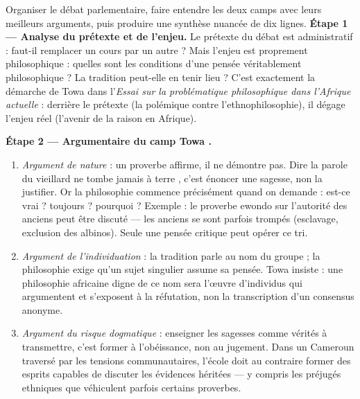 \documentclass[11pt]{article}
\newcounter{popsec}
\newcounter{popsub}
\newcommand{\courssub}[1]{%
  \stepcounter{popsub}%
  \par\vspace{9pt}\noindent{\popxbold\fontsize{11.5}{13}\selectfont\color{popink}{\color{poporange}\thepopsec.\thepopsub}\hspace{6pt}#1}\par\nopagebreak\vspace{4pt}
}
\begin{document}
\courssub{Démarche et corrigé commenté}

\begin{exoresolu}
Organiser le débat parlementaire, faire entendre les deux camps avec leurs meilleurs arguments, puis produire une synthèse nuancée de dix lignes.
\tcblower
\textbf{Étape 1 — Analyse du prétexte et de l'enjeu.} Le prétexte du débat est administratif : faut-il remplacer un cours par un autre ? Mais l'enjeu est proprement philosophique : quelles sont les conditions d'une pensée véritablement philosophique ? La tradition peut-elle en tenir lieu ? C'est exactement la démarche de Towa dans l'\emph{Essai sur la problématique philosophique dans l'Afrique actuelle} : derrière le prétexte (la polémique contre l'ethnophilosophie), il dégage l'enjeu réel (l'avenir de la raison en Afrique).

\textbf{Étape 2 — Argumentaire du camp \guillemotleft Towa \guillemotright.}
\begin{enumerate}
\item \emph{Argument de nature} : un proverbe affirme, il ne démontre pas. Dire \guillemotleft la parole du vieillard ne tombe jamais à terre \guillemotright, c'est énoncer une sagesse, non la justifier. Or la philosophie commence précisément quand on demande : est-ce vrai ? toujours ? pourquoi ? Exemple : le proverbe ewondo sur l'autorité des anciens peut être discuté — les anciens se sont parfois trompés (esclavage, exclusion des albinos). Seule une pensée critique peut opérer ce tri.
\item \emph{Argument de l'individuation} : la tradition parle au nom du groupe ; la philosophie exige qu'un sujet singulier assume sa pensée. Towa insiste : une philosophie africaine digne de ce nom sera l'œuvre d'individus qui argumentent et s'exposent à la réfutation, non la transcription d'un consensus anonyme.
\item \emph{Argument du risque dogmatique} : enseigner les sagesses comme vérités à transmettre, c'est former à l'obéissance, non au jugement. Dans un Cameroun traversé par les tensions communautaires, l'école doit au contraire former des esprits capables de discuter les évidences héritées — y compris les préjugés ethniques que véhiculent parfois certains proverbes.
\end{enumerate}


\end{exoresolu}
\end{document}
